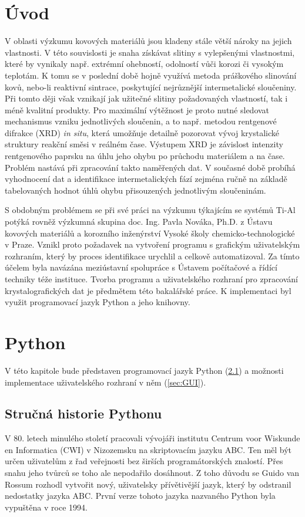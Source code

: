 \documentclass[a4paper, 12pt]{article}
\begin{document}
\section{Úvod}
V oblasti výzkumu kovových materiálů jsou kladeny stále větší nároky na jejich vlastnosti. V této souvislosti je snaha získávat slitiny s vylepšenými vlastnostmi, které by vynikaly např. extrémní ohebností, odolností vůči korozi či vysokým teplotám. K tomu se v poslední době hojně využívá metoda práškového slinování kovů, nebo-li reaktivní sintrace, poskytující nejrůznější intermetalické sloučeniny. Při tomto ději však vznikají jak užitečné slitiny požadovaných vlastností, tak i méně kvalitní produkty. Pro maximální výtěžnost je proto nutné sledovat mechanismus vzniku jednotlivých sloučenin, a to např. metodou rentgenové difrakce (XRD) \textit{in situ}, která umožňuje detailně pozorovat vývoj krystalické struktury reakční směsi v reálném čase. Výstupem XRD je závislost intenzity rentgenového paprsku na úhlu jeho ohybu po průchodu materiálem a na čase. Problém nastává při zpracování takto naměřených dat. V současné době probíhá vyhodnocení dat a identifikace intermetalických fází zejména ručně na základě tabelovaných hodnot úhlů ohybu přisouzených jednotlivým sloučeninám.

S obdobným problémem se při své práci na výzkumu týkajícím se systémů Ti-Al potýká rovněž výzkumná skupina doc. Ing. Pavla Nováka, Ph.D. z Ústavu kovových materiálů a korozního inženýrství Vysoké školy chemicko-technologické v Praze. Vznikl proto požadavek na vytvoření programu s grafickým uživatelským rozhraním, který by proces identifikace urychlil a celkově automatizoval. Za tímto účelem byla navázána meziústavní spolupráce s Ústavem počítačové a řídící techniky téže instituce. Tvorba programu a uživatelského rozhraní pro zpracování krystalografických dat je předmětem této bakalářské práce. K implementaci byl využit programovací jazyk Python a jeho knihovny.
\newpage
\section{Python}
V této kapitole bude představen programovací jazyk Python (\ref{sec:history}) a možnosti implementace uživatelského rozhraní v něm (\ref{sec:GUI}).
\subsection{Stručná historie Pythonu} \label{sec:history}
V 80. letech minulého století pracovali vývojáři institutu Centrum voor Wiskunde en Informatica (CWI) v Nizozemsku na skriptovacím jazyku ABC.  Ten měl být určen uživatelům z řad veřejnosti bez širších programátorských znalostí. \cite{PythonHist:1} Přes snahu jeho tvůrců se toho ale nepodařilo dosáhnout. Z toho důvodu se Guido van Rossum rozhodl vytvořit nový, uživatelsky přívětivější jazyk, který by odstranil nedostatky jazyka ABC. První verze tohoto jazyka nazvaného Python byla vypuštěna v roce 1994. \cite{PythonHist:2}
\end{document}
